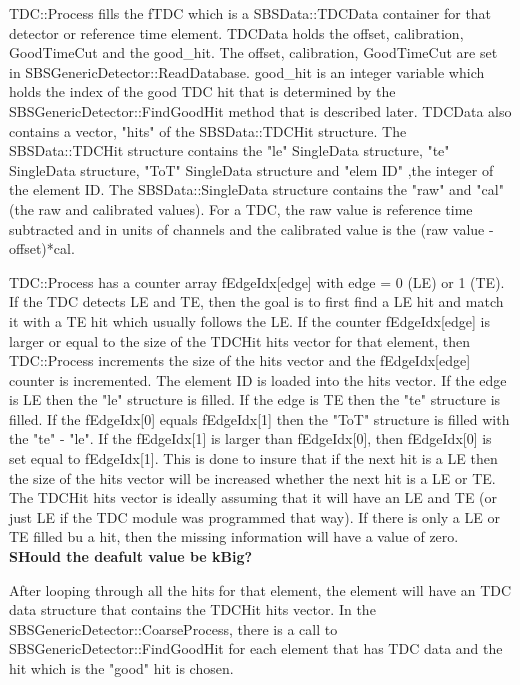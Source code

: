 \documentclass[11pt]{article}
\begin{document}
TDC::Process fills the fTDC which is a SBSData::TDCData container for that detector or reference time element. 
TDCData holds the offset, calibration, GoodTimeCut and the good\_hit. The  offset, calibration, GoodTimeCut
are set in SBSGenericDetector::ReadDatabase. good\_hit is an integer variable
which holds the index of the good TDC hit that is determined by the SBSGenericDetector::FindGoodHit method 
that is described later. TDCData also contains a vector, "hits"  of the SBSData::TDCHit structure. 
The  SBSData::TDCHit structure contains the "le" SingleData structure, "te" SingleData structure,
"ToT" SingleData structure and "elem ID" ,the integer of the element ID. The SBSData::SingleData structure contains
the "raw" and "cal" (the raw and calibrated values). For a TDC, the raw value is reference time subtracted and in units of channels and the calibrated value is the (raw value - offset)*cal.

TDC::Process has a counter array fEdgeIdx[edge] with edge = 0 (LE) or 1 (TE).
If the TDC detects LE and TE, then the goal is to first find a LE hit and match it with a TE hit which usually
follows the LE.
If the counter fEdgeIdx[edge] is larger or equal to the size of the TDCHit hits vector for that element,
then TDC::Process increments the size of the hits vector and the fEdgeIdx[edge] counter is incremented.
The element ID is loaded into the hits vector.
 If the edge is LE then the "le" structure is filled. If the edge is TE then the "te" structure is filled.
 If the fEdgeIdx[0] equals fEdgeIdx[1] then the "ToT" structure is filled with the "te" - "le".
  If the fEdgeIdx[1] is larger than fEdgeIdx[0], then fEdgeIdx[0] is set equal to fEdgeIdx[1]. This
  is done to insure that if the next hit is a LE then the size of the hits vector will be increased
  whether the next hit is a LE or TE. 
  The TDCHit hits vector is ideally assuming that it will have an LE and TE (or just LE if the TDC module
  was programmed that way). If there is only a LE or TE filled bu a hit, then the missing information will have
  a value of zero. {\bf SHould the deafult value be kBig?}
  
  After looping through all the hits for that element, the element will have an TDC data structure
  that contains the TDCHit hits vector. In the SBSGenericDetector::CoarseProcess, there is a
  call to   SBSGenericDetector::FindGoodHit for each element that has TDC data and the hit which
  is the "good" hit is chosen.
    
\end{document}
